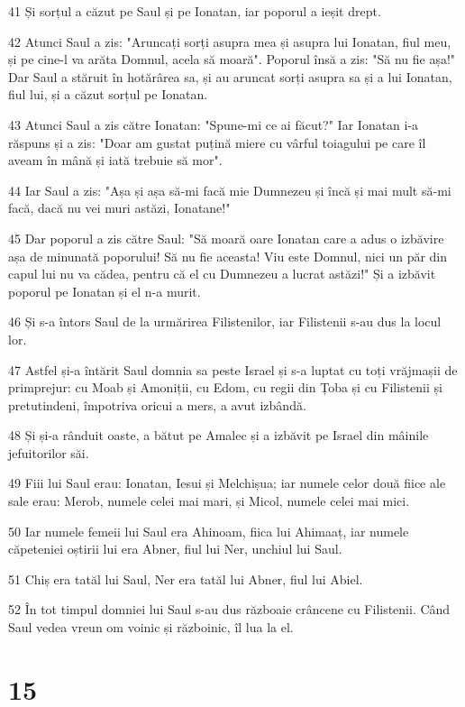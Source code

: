 \par 41 Și sorțul a căzut pe Saul și pe Ionatan, iar poporul a ieșit drept.
\par 42 Atunci Saul a zis: "Aruncați sorți asupra mea și asupra lui Ionatan, fiul meu, și pe cine-l va arăta Domnul, acela să moară". Poporul însă a zis: "Să nu fie așa!" Dar Saul a stăruit în hotărârea sa, și au aruncat sorți asupra sa și a lui Ionatan, fiul lui, și a căzut sorțul pe Ionatan.
\par 43 Atunci Saul a zis către Ionatan: "Spune-mi ce ai făcut?" Iar Ionatan i-a răspuns și a zis: "Doar am gustat puțină miere cu vârful toiagului pe care îl aveam în mână și iată trebuie să mor".
\par 44 Iar Saul a zis: "Așa și așa să-mi facă mie Dumnezeu și încă și mai mult să-mi facă, dacă nu vei muri astăzi, Ionatane!"
\par 45 Dar poporul a zis către Saul: "Să moară oare Ionatan care a adus o izbăvire așa de minunată poporului! Să nu fie aceasta! Viu este Domnul, nici un păr din capul lui nu va cădea, pentru că el cu Dumnezeu a lucrat astăzi!" Și a izbăvit poporul pe Ionatan și el n-a murit.
\par 46 Și s-a întors Saul de la urmărirea Filistenilor, iar Filistenii s-au dus la locul lor.
\par 47 Astfel și-a întărit Saul domnia sa peste Israel și s-a luptat cu toți vrăjmașii de primprejur: cu Moab și Amoniții, cu Edom, cu regii din Țoba și cu Filistenii și pretutindeni, împotriva oricui a mers, a avut izbândă.
\par 48 Și și-a rânduit oaste, a bătut pe Amalec și a izbăvit pe Israel din mâinile jefuitorilor săi.
\par 49 Fiii lui Saul erau: Ionatan, Iesui și Melchișua; iar numele celor două fiice ale sale erau: Merob, numele celei mai mari, și Micol, numele celei mai mici.
\par 50 Iar numele femeii lui Saul era Ahinoam, fiica lui Ahimaaț, iar numele căpeteniei oștirii lui era Abner, fiul lui Ner, unchiul lui Saul.
\par 51 Chiș era tatăl lui Saul, Ner era tatăl lui Abner, fiul lui Abiel.
\par 52 În tot timpul domniei lui Saul s-au dus războaie crâncene cu Filistenii. Când Saul vedea vreun om voinic și războinic, îl lua la el.

\chapter{15}

